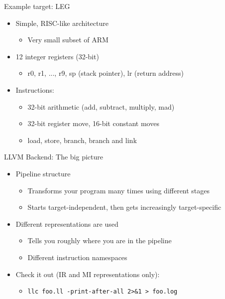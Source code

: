 \begin{frame}{Example target: LEG}

\begin{itemize}
    \item Simple, RISC-like architecture
    \begin{itemize}
        \item Very small subset of ARM
    \end{itemize}
    \item 12 integer registers (32-bit)
    \begin{itemize}
        \item r0, r1, ..., r9, sp (stack pointer), lr (return address)
    \end{itemize}
    \item Instructions:
    \begin{itemize}
        \item 32-bit arithmetic (add, subtract, multiply, mad)
        \item 32-bit register move, 16-bit constant moves
        \item load, store, branch, branch and link
    \end{itemize}
\end{itemize}

\end{frame}



\begin{frame}{LLVM Backend: The big picture}

\begin{itemize}
    \item Pipeline structure
    \begin{itemize}
        \item Transforms your program many times using different stages
        \item Starts target-independent, then gets increasingly target-specific
    \end{itemize}
    \item Different representations are used
    \begin{itemize}
        \item Tells you roughly where you are in the pipeline
        \item Different instruction namespaces
    \end{itemize}
    \item Check it out (IR and MI representations only):
    \begin{itemize}
        \item \texttt{llc foo.ll -print-after-all 2>\&1 > foo.log}
    \end{itemize}
\end{itemize}


\end{frame}

